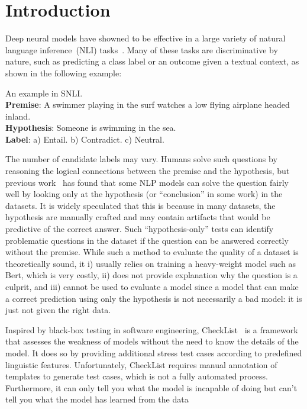 \section{Introduction}
\label{sec:intro}
Deep neural models have showned to be effective in 
a large variety of natural language inference~(NLI)
tasks~\cite{bowman2015large,wang2018glue,mostafazadeh2016corpus,roemmele2011choice,zellers2018swag}. Many of these tasks
are discriminative by nature, such as predicting a class label or
an outcome given a textual context, as shown in the following example:

\begin{example}\label{exp:snli}
An example in SNLI.\\
\textbf{Premise}: A swimmer playing in the surf watches a low flying airplane headed inland. \\
\textbf{Hypothesis}: Someone is swimming in the sea.\\
\textbf{Label}: a) Entail. b) Contradict.  c) Neutral.
\end{example}

The number of candidate labels may vary. Humans solve such questions by
reasoning the logical connections between the premise and the hypothesis,
but previous work~\cite{naik2018stress,schuster2019towards} 
has found that some NLP models can solve the question
fairly well by looking only at the hypothesis (or ``conclusion'' in some work)
in the datasets.
It is widely speculated that this is because in many datasets, 
the hypothesis are manually crafted and may contain artifacts that
would be predictive of the correct answer. 
Such ``hypothesis-only'' tests can identify problematic questions
in the dataset if the question can be answered correctly without 
the premise. While such a method to evaluate the quality of
a dataset is theoretically sound, 
it i) usually relies on training a heavy-weight model such as Bert, which
is very costly, ii) does not provide explanation why the question is 
a culprit, and iii) cannot be used to evaluate a model since a model that
can make a correct prediction using only the hypothesis is not necessarily a
bad model: it is just not given the right data.  



Inspired by black-box testing in software engineering, 
CheckList~\cite{checklist2020acl} is a framework that assesses the weakness of 
models without the need to know the details of the model. It does so by
providing additional stress test cases according to predefined 
linguistic features. Unfortunately, CheckList requires manual annotation 
of templates to generate test cases, which is not a fully automated process. 
Furthermore, it can only tell you what the model is incapable of doing but can't tell 
you what the model has learned from the data 

